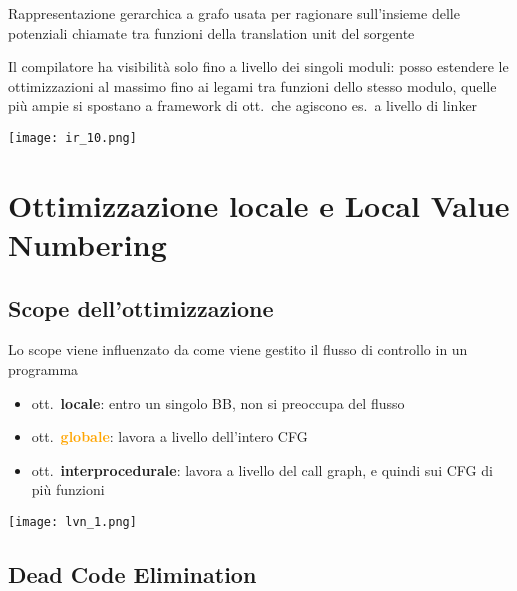 \noindent\begin{minipage}[c]{.6\textwidth}
Rappresentazione gerarchica a grafo usata per ragionare sull'insieme delle potenziali chiamate tra funzioni della translation unit del sorgente

\begin{emphasize}[frametitle={Nota}]
  Il compilatore ha visibilit\`a solo fino a livello dei singoli moduli: posso estendere le ottimizzazioni al massimo fino ai legami tra funzioni dello stesso modulo, quelle pi\`u ampie si spostano a framework di ott.~che agiscono es.~a livello di linker
\end{emphasize}
\end{minipage}
\begin{minipage}[c]{.4\textwidth}
\texttt{[image: ir\_10.png]}
\end{minipage}

\section{Ottimizzazione locale e Local Value Numbering}

\subsection{Scope dell'ottimizzazione}

\noindent\begin{minipage}[c]{.55\textwidth}
Lo scope viene influenzato da come viene gestito il flusso di controllo in un programma

\begin{itemize}
  \item ott.~\textbf{\textcolor{Emerald}{locale}}: entro un singolo BB, non si preoccupa del flusso
  \item ott.~\textbf{\textcolor{Orange}{globale}}: lavora a livello dell'intero CFG
  \item ott.~\textbf{\textcolor{Cerulean}{interprocedurale}}: lavora a livello del call graph, e quindi sui CFG di pi\`u funzioni
\end{itemize}
\end{minipage}\hfill
\begin{minipage}[c]{.4\textwidth}
\texttt{[image: lvn\_1.png]}
\end{minipage}

\subsection{Dead Code Elimination}

